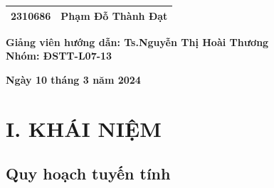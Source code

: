 \documentclass{article}
\begin{document}
\begin{titlepage}
\begin{center}
\begin{tabular}{|w{l}{3.5cm}|p{5.75cm}|}
        2310686 & Phạm Đỗ Thành Đạt \\
        \hline
\end{tabular}
\end{center}
\begin{center}
    \textbf {
    Giảng viên hướng dẫn: Ts.Nguyễn Thị Hoài Thương \\
    Nhóm: ĐSTT-L07-13}
\end{center}
\begin{center}
    \vspace{1cm}
    \large \textbf{Ngày 10 tháng 3 năm 2024}
\end{center}
\end{titlepage}

\thispagestyle{empty}
\clearpage
\thispagestyle{empty}
\tableofcontents
\thispagestyle{empty}
\clearpage
\large


\newpage
{}
\clearpage
\section*{I. KHÁI NIỆM}
\setcounter{section}{1}\setlength{\baselineskip}{15pt}
\setcounter{subsection}{0}
\setcounter{subsubsection}{0}
\large
{} %

\subsection{Quy hoạch tuyến tính}
\large
\end{document}
